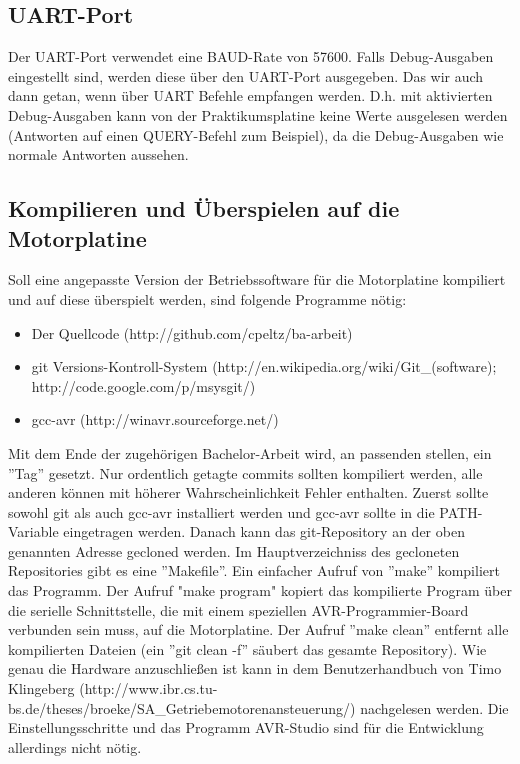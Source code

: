 \documentclass[a4paper]{article}
\begin{document}
	\subsection{UART-Port}
	
	Der UART-Port verwendet eine BAUD-Rate von 57600. Falls Debug-Ausgaben
	eingestellt sind, werden diese über den UART-Port ausgegeben. Das
	wir auch dann getan, wenn über UART Befehle empfangen werden. D.h.
	mit aktivierten Debug-Ausgaben kann von der Praktikumsplatine keine
	Werte ausgelesen werden (Antworten auf einen QUERY-Befehl zum Beispiel),
	da die Debug-Ausgaben wie normale Antworten aussehen.
	
	\subsection{Kompilieren und Überspielen auf die Motorplatine}
	
	Soll eine angepasste Version der Betriebssoftware für die Motorplatine
	kompiliert und auf diese überspielt werden, sind folgende Programme nötig:
	\begin{itemize}
		\item Der Quellcode (http://github.com/cpeltz/ba-arbeit)
		\item git Versions-Kontroll-System (http://en.wikipedia.org/wiki/Git\_(software);
		http://code.google.com/p/msysgit/)
		\item gcc-avr (http://winavr.sourceforge.net/)
	\end{itemize}
	Mit dem Ende der zugehörigen Bachelor-Arbeit wird, an passenden stellen, ein ''Tag''
	gesetzt. Nur ordentlich getagte commits sollten kompiliert werden, alle anderen
	können mit höherer Wahrscheinlichkeit Fehler enthalten. Zuerst sollte sowohl
	git als auch gcc-avr installiert werden und gcc-avr sollte in die PATH-Variable
	eingetragen werden. Danach kann das git-Repository an der oben genannten Adresse
	gecloned werden. Im Hauptverzeichniss des gecloneten Repositories gibt es eine
	''Makefile''. Ein einfacher Aufruf von ''make'' kompiliert das Programm. Der Aufruf
	"make program" kopiert das kompilierte Program über die serielle Schnittstelle,
	die mit einem speziellen AVR-Programmier-Board verbunden sein muss, auf die
	Motorplatine. Der Aufruf ''make clean'' entfernt alle kompilierten Dateien (ein
	''git clean -f'' säubert das gesamte Repository). Wie genau die Hardware anzuschließen
	ist kann in dem Benutzerhandbuch von Timo Klingeberg (http://www.ibr.cs.tu-bs.de/theses/broeke/SA\_Getriebemotorenansteuerung/) nachgelesen werden. Die Einstellungsschritte und
	das Programm AVR-Studio sind für die Entwicklung allerdings nicht nötig.
\end{document}
